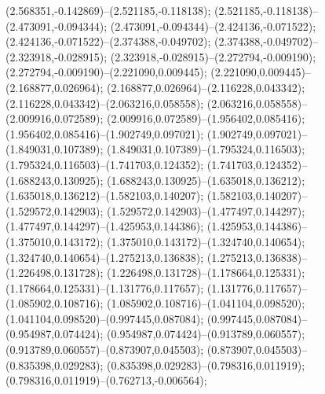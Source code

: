  (2.568351,-0.142869)--(2.521185,-0.118138);
 (2.521185,-0.118138)--(2.473091,-0.094344);
 (2.473091,-0.094344)--(2.424136,-0.071522);
 (2.424136,-0.071522)--(2.374388,-0.049702);
 (2.374388,-0.049702)--(2.323918,-0.028915);
 (2.323918,-0.028915)--(2.272794,-0.009190);
 (2.272794,-0.009190)--(2.221090,0.009445);
 (2.221090,0.009445)--(2.168877,0.026964);
 (2.168877,0.026964)--(2.116228,0.043342);
 (2.116228,0.043342)--(2.063216,0.058558);
 (2.063216,0.058558)--(2.009916,0.072589);
 (2.009916,0.072589)--(1.956402,0.085416);
 (1.956402,0.085416)--(1.902749,0.097021);
 (1.902749,0.097021)--(1.849031,0.107389);
 (1.849031,0.107389)--(1.795324,0.116503);
 (1.795324,0.116503)--(1.741703,0.124352);
 (1.741703,0.124352)--(1.688243,0.130925);
 (1.688243,0.130925)--(1.635018,0.136212);
 (1.635018,0.136212)--(1.582103,0.140207);
 (1.582103,0.140207)--(1.529572,0.142903);
 (1.529572,0.142903)--(1.477497,0.144297);
 (1.477497,0.144297)--(1.425953,0.144386);
 (1.425953,0.144386)--(1.375010,0.143172);
 (1.375010,0.143172)--(1.324740,0.140654);
 (1.324740,0.140654)--(1.275213,0.136838);
 (1.275213,0.136838)--(1.226498,0.131728);
 (1.226498,0.131728)--(1.178664,0.125331);
 (1.178664,0.125331)--(1.131776,0.117657);
 (1.131776,0.117657)--(1.085902,0.108716);
 (1.085902,0.108716)--(1.041104,0.098520);
 (1.041104,0.098520)--(0.997445,0.087084);
 (0.997445,0.087084)--(0.954987,0.074424);
 (0.954987,0.074424)--(0.913789,0.060557);
 (0.913789,0.060557)--(0.873907,0.045503);
 (0.873907,0.045503)--(0.835398,0.029283);
 (0.835398,0.029283)--(0.798316,0.011919);
 (0.798316,0.011919)--(0.762713,-0.006564);
